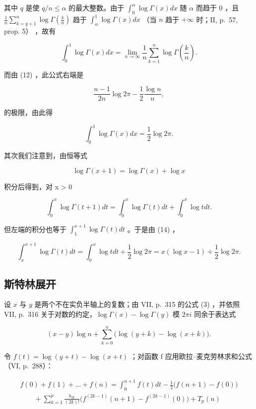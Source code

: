 其中 \(q\) 是使 \(q / n \leqslant \alpha\) 的最大整数。由于 \(\int_{0}^{\alpha} \log \Gamma(x) dx\) 随 \(\alpha\) 而趋于 0 ，且 \(\frac{1}{n} \sum_{k=q+1}^{n} \log \Gamma\left(\frac{k}{n}\right)\) 趋于 \(\int_{\alpha}^{1} \log \Gamma(x) dx\) （当 \(n\) 趋于 \(+\infty\) 时；II, p.~57, prop. 5） ，故有

\[
\int_ {0} ^ {1} \log \Gamma (x) d x = \lim _ {n \rightarrow \infty} \frac {1}{n} \sum_ {k = 1} ^ {n} \log \Gamma \left(\frac {k}{n}\right).
\]

而由 (12) ，此公式右端是

\[
\frac {n - 1}{2 n} \log 2 \pi - \frac {1}{2} \frac {\log n}{n},
\]

的极限，由此得

\[
\int_ {0} ^ {1} \log \Gamma (x) d x = \frac {1}{2} \log 2 \pi .\tag{14}
\]

其次我们注意到，由恒等式

\[
\log \Gamma (x + 1) = \log \Gamma (x) + \log x
\]

积分后得到，对 x \textgreater{} 0

\[
\int_ {0} ^ {x} \log \Gamma (t + 1) d t = \int_ {0} ^ {x} \log \Gamma (t) d t + \int_ {0} ^ {x} \log t d t.
\]

但左端的积分也等于 \(\int_{1}^{x + 1}\log \Gamma (t)dt\) 。于是由 (14) ，

\[
\int_ {x} ^ {x + 1} \log \Gamma (t) d t = \int_ {0} ^ {x} \log t d t + \frac {1}{2} \log 2 \pi = x (\log x - 1) + \frac {1}{2} \log 2 \pi .
\]

\subsection{斯特林展开}

设 \(x\) 与 \(y\) 是两个不在实负半轴上的复数；由 VII, p.~315 的公式 (3) ，并依照 VII, p.~316 关于对数的约定，\(\log \Gamma(x) - \log \Gamma(y)\) 模 \(2\pi i\) 同余于表达式

\[
(x - y) \log n + \sum_ {k = 0} ^ {n} \Big (\log (y + k) - \log (x + k) \Big).\tag{15}
\]

令 \(f(t) = \log(y + t) - \log(x + t)\) ；对函数 f 应用欧拉–麦克劳林求和公式（VI, p.~288）：

\[
\begin{array}{l} f (0) + f (1) + \dots + f (n) = \int_ {0} ^ {n + 1} f (t) d t - \frac {1}{2} \big (f (n + 1) - f (0) \big) \\ \qquad + \sum_ {k = 1} ^ {p} \frac {b _ {2 k}}{(2 k) !} \big (f ^ {(2 k - 1)} (n + 1) - f ^ {(2 k - 1)} (0) \big) + T _ {p} (n) \end{array}
\]

